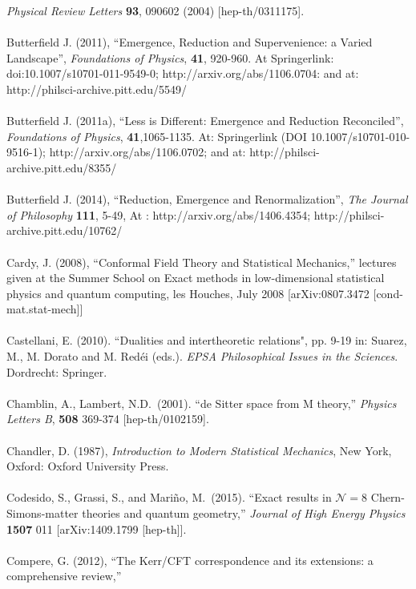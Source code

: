 \documentclass[12pt]{article}
\renewcommand{\^}[1]{\hat{#1}}
\begin{document}
  {\it Physical Review Letters}  {\bf 93}, 090602 (2004)
  [hep-th/0311175].\\
  \\
Butterfield J. (2011), ``Emergence, Reduction and Supervenience: a Varied Landscape'', {\it Foundations of Physics}, {\bf 41},  920-960. At Springerlink: doi:10.1007/s10701-011-9549-0; http://arxiv.org/abs/1106.0704: and at: http://philsci-archive.pitt.edu/5549/ \\
\\
Butterfield J. (2011a), ``Less is Different: Emergence and Reduction Reconciled'', {\it Foundations of Physics}, {\bf 41},1065-1135. At: Springerlink (DOI 10.1007/s10701-010-9516-1); http://arxiv.org/abs/1106.0702;  
and at: http://philsci-archive.pitt.edu/8355/ \\
\\
Butterfield J. (2014), ``Reduction, Emergence and Renormalization'', {\it The Journal of Philosophy} {\bf 111}, 5-49, At : http://arxiv.org/abs/1406.4354; http://philsci-archive.pitt.edu/10762/ \\
\\
Cardy, J. (2008), ``Conformal Field Theory and Statistical Mechanics,'' lectures given at the Summer School on
Exact methods in low-dimensional statistical physics and
quantum computing, les Houches, July 2008 [arXiv:0807.3472 [cond-mat.stat-mech]]\\
\\
Castellani, E. (2010). ``Dualities and intertheoretic relations", pp. 9-19 in: Suarez, M., M. Dorato and M. Red\'{e}i (eds.). \emph{EPSA Philosophical Issues in the Sciences}. Dordrecht: Springer.\\
\\
Chamblin, A., Lambert, N.D.~(2001). ``de Sitter space from M theory,''
  {\it Physics Letters B}, {\bf 508} 369-374 
  [hep-th/0102159].\\
\\
Chandler, D. (1987), {\it Introduction to Modern Statistical Mechanics}, New York, Oxford: Oxford University Press.\\
\\
Codesido, S., Grassi, S., and Mari\~no, M.~(2015). ``Exact results in $ \mathcal{N}=8 $ Chern-Simons-matter theories and quantum geometry,''
{\it Journal of High Energy Physics} {\bf 1507} 011
  [arXiv:1409.1799 [hep-th]].\\
\\
Compere, G. (2012), ``The Kerr/CFT correspondence and its extensions: a comprehensive review,''
\end{document}
